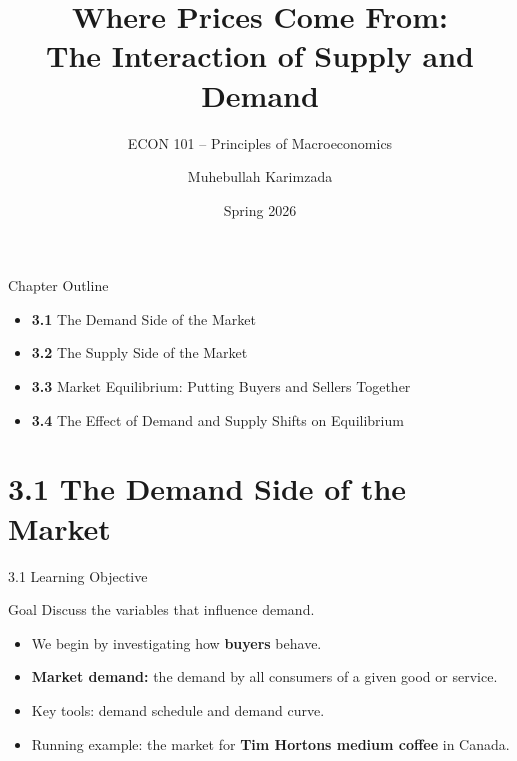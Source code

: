 \documentclass[aspectratio=169]{beamer}
\title{\textbf{Where Prices Come From:\\The Interaction of Supply and Demand}}
\subtitle{{\large ECON 101 -- Principles of Macroeconomics}}
\author{Muhebullah Karimzada}
\date{Spring 2026}
\begin{document}

\begin{frame}[plain]
  \titlepage
\end{frame}

\begin{frame}{Chapter Outline}
\transfade
\begin{itemize}[<+->]
  \item \textbf{3.1} The Demand Side of the Market
  \item \textbf{3.2} The Supply Side of the Market
  \item \textbf{3.3} Market Equilibrium: Putting Buyers and Sellers Together
  \item \textbf{3.4} The Effect of Demand and Supply Shifts on Equilibrium
\end{itemize}
\end{frame}

\section{3.1 The Demand Side of the Market}

\begin{frame}{3.1 Learning Objective}
\transfade
\begin{block}{Goal}
Discuss the variables that influence demand.
\end{block}
\begin{itemize}[<+->]
  \item We begin by investigating how \textbf{buyers} behave.
  \item \textbf{Market demand:} the demand by all consumers of a given good or service.
  \item Key tools: demand schedule and demand curve.
  \item Running example: the market for \textbf{Tim Hortons medium coffee} in Canada.
\end{itemize}
\end{frame}
\end{document}
